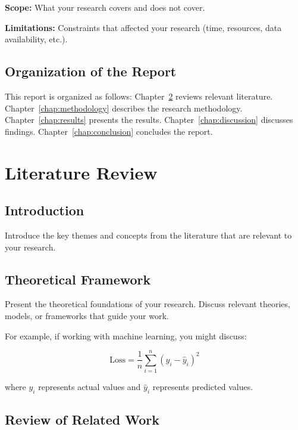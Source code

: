 \documentclass[12pt, a4paper]{report}
\begin{document}
	\textbf{Scope:} What your research covers and does not cover.
	
	\textbf{Limitations:} Constraints that affected your research (time, resources, data availability, etc.).
	
	\section{Organization of the Report}
	\label{sec:organization}
	
	This report is organized as follows: Chapter~\ref{chap:literature} reviews relevant literature. Chapter~\ref{chap:methodology} describes the research methodology. Chapter~\ref{chap:results} presents the results. Chapter~\ref{chap:discussion} discusses findings. Chapter~\ref{chap:conclusion} concludes the report.
	
	\chapter{Literature Review}
	\label{chap:literature}
	
	\section{Introduction}
	
	Introduce the key themes and concepts from the literature that are relevant to your research.
	
	\section{Theoretical Framework}
	\label{sec:theory}
	
	Present the theoretical foundations of your research. Discuss relevant theories, models, or frameworks that guide your work.
	
	For example, if working with machine learning, you might discuss:
	
	\begin{equation}
		\text{Loss} = \frac{1}{n}\sum_{i=1}^{n}(y_i - \hat{y}_i)^2
		\label{eq:mse}
	\end{equation}
	
	where $y_i$ represents actual values and $\hat{y}_i$ represents predicted values.
	
	\section{Review of Related Work}
	\label{sec:related}
	
\end{document}

